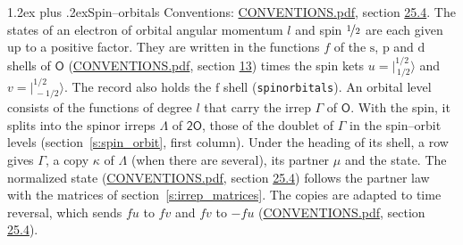 \documentclass[10pt,a4paper]{article}
\makeatletter
\renewcommand\section{\@startsection{section}{1}{\z@}{-3ex plus -1ex minus -.2ex}%
  {1.2ex plus .2ex}{\normalfont\large\sffamily\bfseries\color{parttitle}}}
\numberwithin{equation}{section}
\newcommand{\grp}[1]{\mathsf{#1}}
\newcommand{\orbital}[1]{\mathrm{#1}}
\newcommand{\mult}{\kappa}
\newcommand{\intx}{\mu}
\newcommand{\jm}[2]{\bigl\lvert{}^{#1}_{\,#2}\bigr\rangle}
\makeatother
\begin{document}
\section{Spin--orbitals}\label{s:spin_orbitals}
Conventions: \href{../../CONVENTIONS.pdf}{CONVENTIONS.pdf}, section \href{../../CONVENTIONS.pdf\#conv.25.4}{25.4}.
\leavevmode\label{n:index.orbital.l}The states of an electron of orbital angular momentum $l$ and spin $\nicefrac{1}{2}$ are each given up to a positive factor. \label{n:local.spinor.uv}\label{n:local.function.f}They are written in the functions $f$ of the $\orbital{s}$, $\orbital{p}$ and $\orbital{d}$ shells of \href{../../../rotation/data/pdf/O.pdf}{$\grp{O}$} (\href{../../CONVENTIONS.pdf}{CONVENTIONS.pdf}, section \href{../../../rotation/CONVENTIONS.pdf\#conv.13}{13}) times the spin kets $u = \jm{1/2}{1/2}$ and $v = \jm{1/2}{-1/2}$. The record also holds the $\orbital{f}$ shell (\texttt{spinorbitals}). An orbital level consists of the functions of degree $l$ that carry the irrep $\Gamma$ of \href{../../../rotation/data/pdf/O.pdf}{$\grp{O}$}. With the spin, it splits into the spinor irreps $\Lambda$ of $\grp{2O}$, those of the doublet of $\Gamma$ in the spin--orbit levels (section~\ref{s:spin_orbit}, first column). \label{n:head.state}Under the heading of its shell, a row gives $\Gamma$, a copy $\mult$ of $\Lambda$ (when there are several), its partner $\intx$ and the state. The normalized state (\href{../../CONVENTIONS.pdf}{CONVENTIONS.pdf}, section \href{../../CONVENTIONS.pdf\#conv.25.4}{25.4}) follows the partner law with the matrices of section~\ref{s:irrep_matrices}. The copies are adapted to time reversal, which sends $f u$ to $f v$ and $f v$ to $-f u$ (\href{../../CONVENTIONS.pdf}{CONVENTIONS.pdf}, section \href{../../CONVENTIONS.pdf\#conv.25.4}{25.4}).
\end{document}
